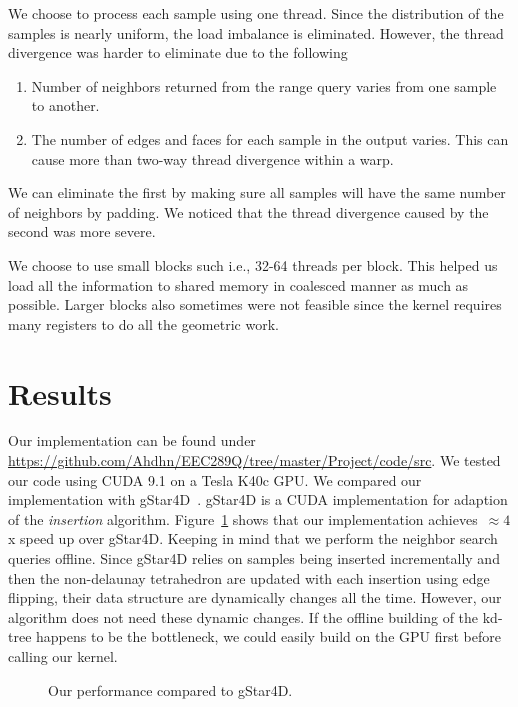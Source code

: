 \documentclass[12pt] {article}
\begin{document}
We choose to process each sample using one thread. Since the distribution of the samples is nearly uniform, the load imbalance is eliminated. However, the thread divergence was harder to eliminate due to the following 
\begin{enumerate}
\item Number of neighbors returned from the range query varies from one sample to another. 
\item The number of edges and faces for each sample in the output varies. This can cause more than two-way thread divergence within a warp. 
\end{enumerate}

We can eliminate the first by making sure all samples will have the same number of neighbors by padding. We noticed that the thread divergence caused by the second was more severe. 

We choose to use small blocks such i.e., 32-64 threads per block. This helped us load all the information to shared memory in coalesced manner as much as possible. Larger blocks also sometimes were not feasible since the kernel requires many registers to do all the geometric work. 

\section*{Results}
Our implementation can be found under \url{https://github.com/Ahdhn/EEC289Q/tree/master/Project/code/src}. We tested our code using CUDA 9.1 on a Tesla K40c GPU. We compared our implementation with gStar4D~\citep{cao2014gpu}. gStar4D is a CUDA implementation for adaption of the \emph{insertion} algorithm. Figure~\ref{fig:timing} shows that our implementation achieves~$\approx4$x speed up over gStar4D. Keeping in mind that we perform the neighbor search queries offline. Since gStar4D relies on samples being inserted incrementally and then the non-delaunay tetrahedron are updated with each insertion using edge flipping, their data structure are dynamically changes all the time. However, our algorithm does not need these dynamic changes. If the offline building of the kd-tree happens to be the bottleneck, we could easily build on the GPU first before calling our kernel.

\begin{figure}[!tbh]
\centering        
   \caption{Our performance compared to gStar4D.}
   \label{fig:timing}
\end{figure}
\end{document}
